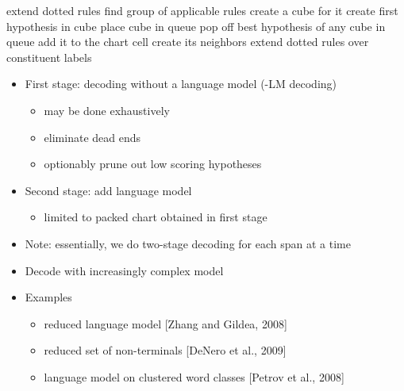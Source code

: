 \documentclass[landscape]{slides}
\renewcommand{\algorithmicrequire}{\textbf{Input:}}
\renewcommand{\algorithmicensure}{\textbf{Output:}}
\begin{document}
\vspace{5mm}
\begin{algorithmic}[1]
\renewcommand{\algorithmicrequire}{\textbf{Input:}} 
\renewcommand{\algorithmicensure}{\textbf{Output:}}
  
  \STATE extend dotted rules
    \STATE find group of applicable rules
    \STATE create a cube for it
    \STATE create first hypothesis in cube
    \STATE place cube in queue
  \ENDFOR
    \STATE pop off best hypothesis of any cube in queue
    \STATE add it to the chart cell
    \STATE create its neighbors
  \ENDFOR
  \STATE extend dotted rules over constituent labels
\ENDFOR
\end{algorithmic}


\begin{itemize} \vspace{10mm} \itemsep 10mm
\item First stage: decoding without a language model (-LM decoding)
\begin{itemize}
\item may be done exhaustively
\item eliminate dead ends
\item optionably prune out low scoring hypotheses
\end{itemize}
\item Second stage: add language model
\begin{itemize}
\item limited to packed chart obtained in first stage
\end{itemize}
\item Note: essentially, we do two-stage decoding for each span at a time
\end{itemize}


\begin{itemize} \vspace{30mm} \itemsep 15mm
\item Decode with increasingly complex model
\item Examples
\begin{itemize}
\item reduced language model [Zhang and Gildea, 2008]
\item reduced set of non-terminals [DeNero et al., 2009]
\item language model on clustered word classes [Petrov et al., 2008]
\end{itemize}
\end{itemize}
\end{document}
